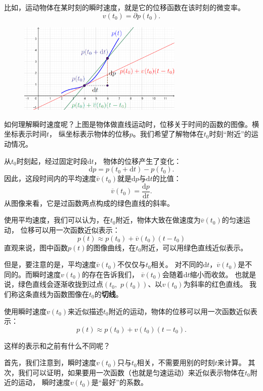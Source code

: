 \documentclass[12pt,UTF8]{ctexbook}
\begin{document}
比如，运动物体在某时刻的瞬时速度，就是它的位移函数在该时刻的微变率。
$$ v(t_0) = \partial p(t_0).$$

\begin{figure}[h]
    \vspace{4pt}
    \centering
    \includegraphics[width=0.7\textwidth]{tu/导数1.png}
\end{figure}

如何理解瞬时速度呢？上图是物体做直线运动时，位移关于时间的函数的图像。横坐标表示时间$t$，
纵坐标表示物体的位移$p$。我们希望了解物体在$t_0$时刻“附近”的运动情况。

从$t_0$时刻起，经过固定时段$\mathrm{d}t$，
物体的位移产生了变化：
$$\mathrm{d}p = p(t_0 + \mathrm{d}t) - p(t_0).$$
因此，这段时间内的平均速度$\overline{v}(t_0)$就是$\mathrm{d}p$与$\mathrm{d}t$的比值：
$$\overline{v}(t_0) = \frac{\mathrm{d}p}{\mathrm{d}t}.$$
从图像来看，它是过函数两点构成的绿色直线的斜率。

使用平均速度，我们可以认为，在$t_0$附近，物体大致在做速度为$\overline{v}(t_0)$的匀速运动，
位移可以用一次函数近似表示：
$$ p(t) \approx p(t_0) + \overline{v}(t_0)(t - t_0)$$
直观来说，图中函数$p(t)$的图像曲线，在$t_0$附近，可以用绿色直线近似表示。

但是，要注意的是，平均速度$\overline{v}(t_0)$不仅仅与$t_0$相关。
对不同的$\mathrm{d}t$，$\overline{v}(t_0)$是不同的。而瞬时速度$v(t_0)$的存在告诉我们，
$\overline{v}(t_0)$会随着$\mathrm{d}t$缩小而收敛。
也就是说，绿色直线会逐渐收拢到过点$(t_0, \,\,p(t_0))$、以$v(t_0)$为斜率的红色直线。
我们称这条直线为函数图像在$t_0$的\textbf{切线}。

使用瞬时速度$v(t_0)$来近似描述$t_0$附近的运动，物体的位移可以用一次函数近似表示：
$$ p(t) \approx p(t_0) + v(t_0)(t - t_0).$$

这样的表示和之前有什么不同呢？

首先，我们注意到，瞬时速度$v(t_0)$只与$t_0$相关，不需要用别的时刻$t$来计算。
其次，我们可以证明，如果要用一次函数（也就是匀速运动）来近似表示物体在$t_0$附近的运动，
瞬时速度$v(t_0)$是“最好”的系数。
\end{document}

